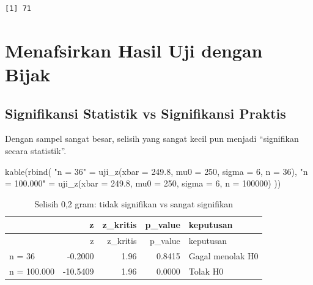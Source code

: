 \documentclass[
  indonesian,
  letterpaper,
]{book}
\newenvironment{Shaded}{\begin{snugshade}}{\end{snugshade}}
\newcommand{\AttributeTok}[1]{\textcolor[rgb]{0.40,0.45,0.13}{#1}}
\newcommand{\DecValTok}[1]{\textcolor[rgb]{0.68,0.00,0.00}{#1}}
\newcommand{\FloatTok}[1]{\textcolor[rgb]{0.68,0.00,0.00}{#1}}
\newcommand{\FunctionTok}[1]{\textcolor[rgb]{0.28,0.35,0.67}{#1}}
\newcommand{\NormalTok}[1]{\textcolor[rgb]{0.00,0.23,0.31}{#1}}
\newcommand{\OtherTok}[1]{\textcolor[rgb]{0.00,0.23,0.31}{#1}}
\newcommand{\StringTok}[1]{\textcolor[rgb]{0.13,0.47,0.30}{#1}}
\begin{document}
\begin{verbatim}
[1] 71
\end{verbatim}


\chapter{Menafsirkan Hasil Uji dengan
Bijak}\label{menafsirkan-hasil-uji-dengan-bijak}

\section{Signifikansi Statistik vs Signifikansi
Praktis}\label{signifikansi-statistik-vs-signifikansi-praktis}

Dengan sampel sangat besar, selisih yang sangat kecil pun menjadi
``signifikan secara statistik''.

\begin{Shaded}
\begin{Highlighting}[]
\FunctionTok{kable}\NormalTok{(}\FunctionTok{rbind}\NormalTok{(}
  \StringTok{"n = 36"}      \OtherTok{=} \FunctionTok{uji\_z}\NormalTok{(}\AttributeTok{xbar =} \FloatTok{249.8}\NormalTok{, }\AttributeTok{mu0 =} \DecValTok{250}\NormalTok{, }\AttributeTok{sigma =} \DecValTok{6}\NormalTok{, }\AttributeTok{n =} \DecValTok{36}\NormalTok{),}
  \StringTok{"n = 100.000"} \OtherTok{=} \FunctionTok{uji\_z}\NormalTok{(}\AttributeTok{xbar =} \FloatTok{249.8}\NormalTok{, }\AttributeTok{mu0 =} \DecValTok{250}\NormalTok{, }\AttributeTok{sigma =} \DecValTok{6}\NormalTok{, }\AttributeTok{n =} \DecValTok{100000}\NormalTok{)}
\NormalTok{))}
\end{Highlighting}
\end{Shaded}

\begin{longtable}[]{@{}lrrrl@{}}
\caption{Selisih 0,2 gram: tidak signifikan vs sangat
signifikan}\tabularnewline
\toprule\noalign{}
& z & z\_kritis & p\_value & keputusan \\
\midrule\noalign{}
\endfirsthead
\toprule\noalign{}
& z & z\_kritis & p\_value & keputusan \\
\midrule\noalign{}
\endhead
\bottomrule\noalign{}
\endlastfoot
n = 36 & -0.2000 & 1.96 & 0.8415 & Gagal menolak H0 \\
n = 100.000 & -10.5409 & 1.96 & 0.0000 & Tolak H0 \\
\end{longtable}
\end{document}
